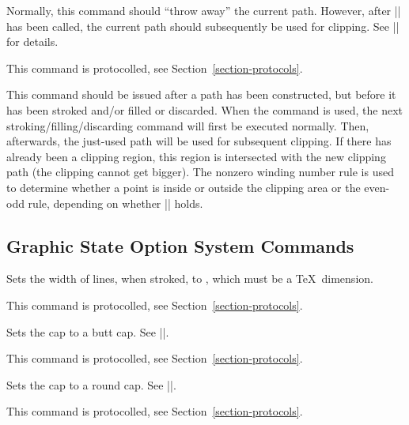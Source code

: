 \begin{command}{\pgfsys@discardpath}
 Normally, this command should ``throw away'' the current path.
 However, after |\pgfsys@clipnext| has been called, the current path
 should subsequently be used for clipping. See |\pgfsys@clipnext| for
 details.

  This command is protocolled, see Section~\ref{section-protocols}.
\end{command}


\begin{command}{\pgfsys@clipnext}
  This command should be issued after a path has been constructed, but
  before it has been stroked and/or filled or discarded. When the
  command is used, the next stroking/filling/discarding command will
  first be executed normally. Then, afterwards, the just-used path
  will be used for subsequent clipping. If there has already been a
  clipping region, this region is intersected with the new clipping
  path (the clipping cannot get bigger). The nonzero winding number
  rule is used to determine whether a point is inside or outside the
  clipping area or the even-odd rule, depending on whether
  |\ifpgfsys@eorule| holds.
\end{command}




\subsection{Graphic State Option System Commands}

\begin{command}{\pgfsys@setlinewidth{}}
  Sets the width of lines, when stroked, to , which must
  be a \TeX\ dimension.

  This command is protocolled, see Section~\ref{section-protocols}.
\end{command}

\begin{command}{\pgfsys@buttcap}
  Sets the cap to a butt cap. See |\pgfsys@stroke|.

  This command is protocolled, see Section~\ref{section-protocols}.
\end{command}

\begin{command}{\pgfsys@roundcap}
  Sets the cap to a round cap. See |\pgfsys@stroke|.

  This command is protocolled, see Section~\ref{section-protocols}.
\end{command}

